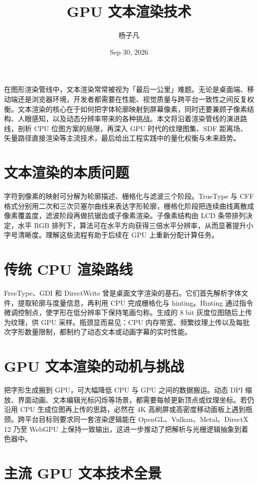\title{GPU 文本渲染技术}
\author{杨子凡}
\date{Sep 30, 2026}
\maketitle
在图形渲染管线中，文本渲染常常被视为「最后一公里」难题。无论是桌面端、移动端还是浏览器环境，开发者都需要在性能、视觉质量与跨平台一致性之间反复权衡。文本渲染的核心在于如何把字体轮廓映射到屏幕像素，同时还要兼顾子像素结构、人眼感知，以及动态分辨率带来的各种挑战。本文将沿着渲染管线的演进路线，剖析 CPU 位图方案的局限，再深入 GPU 时代的纹理图集、SDF 距离场、矢量路径直接渲染等主流技术，最后给出工程实践中的量化权衡与未来趋势。\par
\chapter{文本渲染的本质问题}
字符到像素的映射可分解为轮廓描述、栅格化与滤波三个阶段。TrueType 与 CFF 格式分别用二次和三次贝塞尔曲线来表达字形轮廓，栅格化阶段把连续曲线离散成像素覆盖度，滤波阶段再做抗锯齿或子像素渲染。子像素结构由 LCD 条带排列决定，水平 RGB 排列下，算法可在水平方向获得三倍水平分辨率，从而显著提升小字号清晰度。理解这些流程有助于后续在 GPU 上重新分配计算任务。\par
\chapter{传统 CPU 渲染路线}
FreeType、GDI 和 DirectWrite 曾是桌面文字渲染的基石。它们首先解析字体文件，提取轮廓与度量信息，再利用 CPU 完成栅格化与 hinting。Hinting 通过指令微调控制点，使字形在低分辨率下保持笔画匀称。生成的 8 bit 灰度位图随后上传为纹理，供 GPU 采样。瓶颈显而易见：CPU 内存带宽、频繁纹理上传以及每批次字形数量限制，都制约了动态文本或动画字幕的实时性能。\par
\chapter{GPU 文本渲染的动机与挑战}
把字形生成搬到 GPU，可大幅降低 CPU 与 GPU 之间的数据搬运。动态 DPI 缩放、界面动画、文本编辑光标闪烁等场景，都需要每帧更新顶点或纹理坐标。若仍沿用 CPU 生成位图再上传的思路，必然在 4K 高刷屏或高密度移动面板上遇到瓶颈。跨平台目标则要求同一套渲染逻辑能在 OpenGL、Vulkan、Metal、DirectX 12 乃至 WebGPU 上保持一致输出，这进一步推动了把解析与光栅逻辑抽象到着色器中。\par
\chapter{主流 GPU 文本技术全景}
